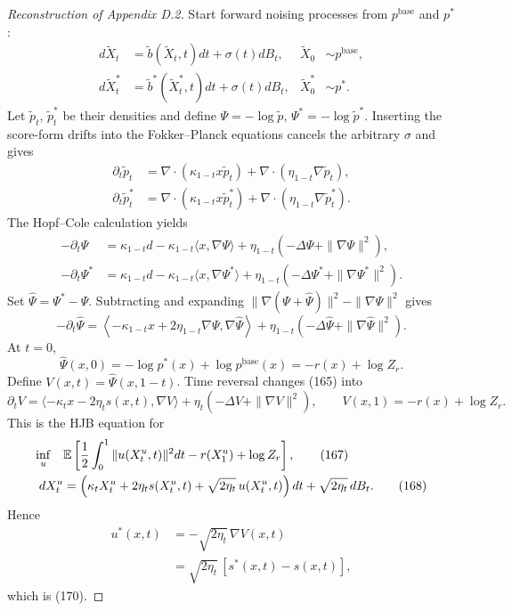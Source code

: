 \begin{proof}[Reconstruction of Appendix D.2]
Start forward noising processes from $p^{\mathrm{base}}$ and $p^*$:
\begin{align*}
 d\widetilde X_t&=\widetilde b(\widetilde X_t,t)dt+\sigma(t)dB_t,
 &\widetilde X_0&\sim p^{\mathrm{base}},
 \tag{157}\\
 d\widetilde X_t^*&=\widetilde b^*(\widetilde X_t^*,t)dt+\sigma(t)dB_t,
 &\widetilde X_0^*&\sim p^*.
 \tag{158}
\end{align*}
Let $\widetilde p_t$, $\widetilde p_t^*$ be their densities and define
$\Psi=-\log\widetilde p$, $\Psi^*=-\log\widetilde p^*$.  Inserting the score-form drifts into the Fokker--Planck equations cancels the arbitrary $\sigma$ and gives
\begin{align*}
 \partial_t\widetilde p_t
 &=\nabla\cdot(\kappa_{1-t}x\widetilde p_t)+\nabla\cdot(\eta_{1-t}\nabla\widetilde p_t),\\
 \partial_t\widetilde p_t^*
 &=\nabla\cdot(\kappa_{1-t}x\widetilde p_t^*)+\nabla\cdot(\eta_{1-t}\nabla\widetilde p_t^*).
 \tag{161}
\end{align*}
The Hopf--Cole calculation yields
\begin{align*}
 -\partial_t\Psi
 &=\kappa_{1-t}d-\kappa_{1-t}\langle x,\nabla\Psi\rangle
 +\eta_{1-t}(-\Delta\Psi+\|\nabla\Psi\|^2),
 \tag{163}\\
 -\partial_t\Psi^*
 &=\kappa_{1-t}d-\kappa_{1-t}\langle x,\nabla\Psi^*\rangle
 +\eta_{1-t}(-\Delta\Psi^*+\|\nabla\Psi^*\|^2).
 \tag{164}
\end{align*}
Set $\widehat\Psi=\Psi^*-\Psi$.  Subtracting and expanding
$\|\nabla(\Psi+\widehat\Psi)\|^2-\|\nabla\Psi\|^2$ gives
\begin{equation*}
 -\partial_t\widehat\Psi
 =\left\langle
 -\kappa_{1-t}x+2\eta_{1-t}\nabla\Psi,
 \nabla\widehat\Psi
 \right\rangle
 +\eta_{1-t}(-\Delta\widehat\Psi+\|\nabla\widehat\Psi\|^2).
 \tag{165}
\end{equation*}
At $t=0$,
\begin{equation*}
 \widehat\Psi(x,0)
 =-\log p^*(x)+\log p^{\mathrm{base}}(x)
 =-r(x)+\log Z_r.
 \tag{165b}
\end{equation*}
Define $V(x,t)=\widehat\Psi(x,1-t)$.  Time reversal changes (165) into
\begin{equation*}
 \partial_tV
 =\langle-\kappa_tx-2\eta_ts(x,t),\nabla V\rangle
 +\eta_t(-\Delta V+\|\nabla V\|^2),
 \qquad
 V(x,1)=-r(x)+\log Z_r.
 \tag{166$'$}
\end{equation*}
This is the HJB equation for
\begin{align*}
 \inf_u\quad
 &\mathbb{E}\left[
 \frac12\int_0^1\|u(X_t^u,t)\|^2dt-r(X_1^u)+\log Z_r
 \right],
 \tag{167}\\
 dX_t^u&=\left(\kappa_tX_t^u+2\eta_ts(X_t^u,t)+\sqrt{2\eta_t}\,u(X_t^u,t)\right)dt
 +\sqrt{2\eta_t}\,dB_t.
 \tag{168}
\end{align*}
Hence
\begin{align*}
 u^*(x,t)
 &=-\sqrt{2\eta_t}\,\nabla V(x,t)\\
 &=\sqrt{2\eta_t}\,[s^*(x,t)-s(x,t)],
 \tag{169}
\end{align*}
which is (170).


\end{proof}
